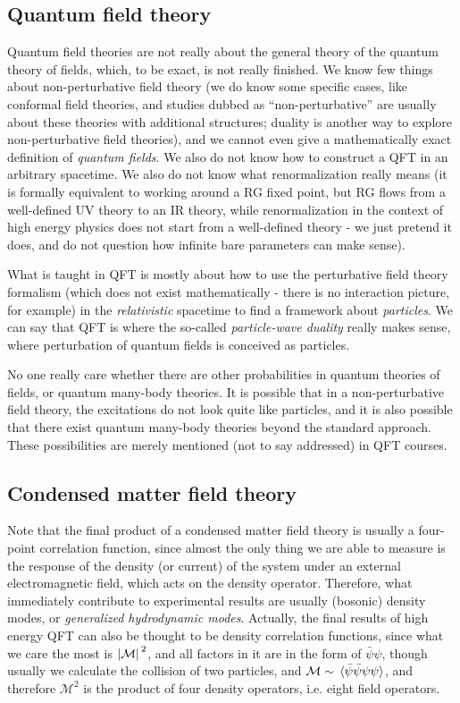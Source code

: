 \documentclass[hyperref, a4paper]{article}
\begin{document}
\subsection{Quantum field theory}

Quantum field theories are not really about the general theory of the quantum theory of fields, which, to be exact,
is not really finished. We know few things about non-perturbative field theory (we do know some specific cases, 
like conformal field theories, and studies dubbed as ``non-perturbative'' are usually about these theories with 
additional structures; duality is another way to explore non-perturbative field theories), and we cannot even 
give a mathematically exact definition of \emph{quantum fields}. We also do not know how to construct a QFT in 
an arbitrary spacetime. We also do not know what renormalization really means (it is formally equivalent to working 
around a RG fixed point, but RG flows from a well-defined UV theory to an IR theory, while renormalization in the 
context of high energy physics does not start from a well-defined theory - we just pretend it does, and do not
question how infinite bare parameters can make sense). 

What is taught in QFT is mostly about how to use the perturbative field theory formalism (which does not exist 
mathematically - there is no interaction picture, for example) in the \emph{relativistic} spacetime to find 
a framework about \emph{particles}. We can say that QFT is where the so-called \emph{particle-wave duality} 
really makes sense, where perturbation of quantum fields is conceived as particles. 

No one really care whether there are other probabilities in quantum theories of fields, or quantum many-body 
theories. It is possible that in a non-perturbative field theory, the excitations do not look quite like 
particles, and it is also possible that there exist quantum many-body theories beyond the standard approach.
These possibilities are merely mentioned (not to say addressed) in QFT courses.

\subsection{Condensed matter field theory}

Note that the final product of a condensed matter field theory is usually a four-point correlation function,
since almost the only thing we are able to measure is the response of the density (or current) of the system
under an external electromagnetic field, which acts on the density operator. Therefore, what immediately 
contribute to experimental results are usually (bosonic) density modes, or \emph{generalized hydrodynamic
modes}. Actually, the final results of high energy QFT can also be thought to be density correlation functions,
since what we care the most is $\abs*{\mathcal{M}}^2$, and all factors in it are in the form of $\bar{\psi} \psi$,
though usually we calculate the collision of two particles, and $\mathcal{M} \sim \expval*{\bar{\psi} \bar{\psi} \psi \psi}$,
and therefore $\mathcal{M}^2$ is the product of four density operators, i.e. eight field operators.
\end{document}
